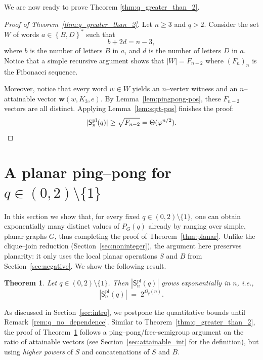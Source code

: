 \documentclass[A4paper,reqno,oneside,12pt]{amsart}
\theoremstyle{plain}
\newtheorem{theorem}{Theorem}[section]
\theoremstyle{definition}
\DeclareMathOperator{\pl}{\mathrm{pl}}
\newcommand{\set}[1]{\left\{ #1 \right\}}
\begin{document}
We are now ready to prove Theorem \ref{thm:q_greater_than_2}.

\begin{proof}[Proof of Theorem~\ref{thm:q_greater_than_2}]
    Let $n \geq 3$ and $q > 2$. Consider the set $W$ of words $a \in \set{B,D}^\ast$ such that 
    \begin{equation*}
         b+2d= n-3,
    \end{equation*}
    where $b$ is the number of letters $B$ in $a$, and $d$ is the number of letters $D$ in $a$. Notice that a simple recursive argument shows that $|W| = F_{n-2}$ where $(F_n)_{n}$ is the Fibonacci sequence.
    
    Moreover, notice that every word $w\in W$ yields an $n$--vertex witness and an $n$--attainable vector $\mathbf{w}(w, K_3, e)$.
By Lemma~\ref{lem:pingpong-pos}, these $F_{n-2}$ vectors are all distinct. Applying Lemma~\ref{lem:sqrt-pos} finishes the proof:
\[
|\mathsf{S}^{\pl}_n(q)|\ge \sqrt{F_{n-2}} = \Theta(\varphi^{n/2}).\qedhere
\]
\end{proof}

\section{A planar ping--pong for \texorpdfstring{$q\in(0,2)\setminus\{1\}$}{q in (0,2) - 1}}\label{sec:planar_0_2}

In this section we show that, for every fixed $q\in(0,2)\setminus\{1\}$, one can obtain exponentially many distinct values of $P_G(q)$ already by ranging over simple, planar graphs $G$, thus completing the proof of Theorem~\ref{thm:planar}.
Unlike the clique--join reduction (Section~\ref{sec:noninteger}), the argument here preserves planarity: it only uses the local planar operations $S$ and $B$ from Section~\ref{sec:negative}. We show the following result.

\begin{theorem}\label{thm:planar_0_2}
Let $q\in(0,2)\setminus\{1\}$. Then $|\mathsf{S}^{\mathrm{pl}}_n(q)|$ grows exponentially in $n$, i.e.,
\[
|\mathsf{S}^{\mathrm{pl}}_n(q)| \;=\; 2^{\Omega_{q}(n)}.
\]
\end{theorem}


As discussed in Section~\ref{sec:intro}, we postpone the quantitative bounds until Remark~\ref{rem:q_no_dependence}. Similar to Theorem~\ref{thm:q_greater_than_2}, the proof of Theorem~\ref{thm:planar_0_2} follows a ping--pong/free-semigroup argument on the ratio of attainable vectors (see Section~\ref{sec:attainable_int} for the definition), but using \emph{higher powers} of $S$ and concatenations of $S$ and $B$.
\end{document}

